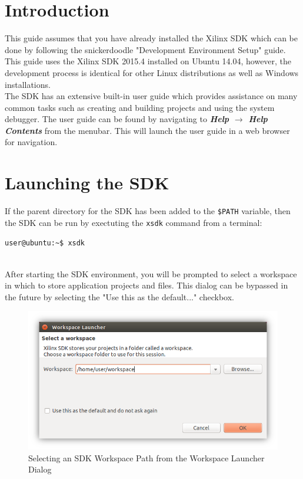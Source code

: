 \section{Introduction}


This guide assumes that you have already installed the Xilinx SDK which can be done by following the snickerdoodle "Development Environment Setup" guide. This guide uses the Xilinx SDK 2015.4 installed on Ubuntu 14.04, however, the development process is identical for other Linux distributions as well as Windows installations. \\


\noindent
The SDK has an extensive built-in user guide which provides assistance on many common tasks such as creating and building projects and using the system debugger. The user guide can be found by navigating to \textit{\bfseries Help $\rightarrow$ Help Contents} from the menubar. This will launch the user guide in a web browser for navigation.


\section{Launching the SDK}
If the parent directory for the SDK has been added to the \Verb|$PATH| variable, then the SDK can be run by exectuting the \texttt{xsdk} command from a terminal: \\

\begin{lstlisting}
user@ubuntu:~$ xsdk
\end{lstlisting}

~\\
\noindent
After starting the SDK environment, you will be prompted to select a workspace in which to store application projects and files. This dialog can be bypassed in the future by selecting the "Use this as the default..." checkbox. \\

\begin{figure}[h]
	\centering
	\includegraphics{images/Workspace_Selection.png}
	\caption{Selecting an SDK Workspace Path from the Workspace Launcher Dialog}
	\label{fig:workspacedialog}
\end{figure}


